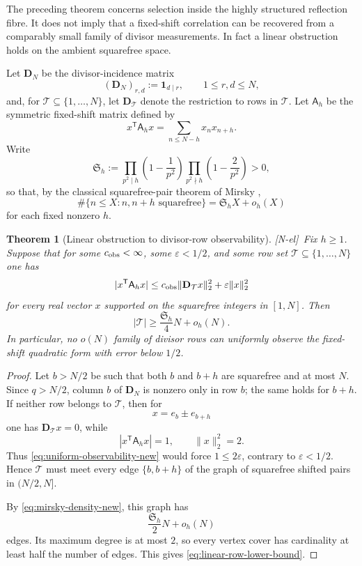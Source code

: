 \documentclass[11pt]{amsart}
\numberwithin{equation}{section}
\theoremstyle{plain}
\newtheorem{theorem}{Theorem}[section]
\theoremstyle{definition}
\theoremstyle{remark}
\newcommand{\tagNE}{\textup{[N-el]}}
\begin{document}
The preceding theorem concerns selection inside the highly structured reflection fibre.  It does not imply that a fixed-shift correlation can be recovered from a comparably small family of divisor measurements.  In fact a linear obstruction holds on the ambient squarefree space.

Let $\mathbf D_N$ be the divisor-incidence matrix
\[
(\mathbf D_N)_{r,d}:=\mathbf 1_{d\mid r},
\qquad 1\le r,d\le N,
\]
and, for $\mathcal T\subseteq\{1,\dots,N\}$, let $\mathbf D_\mathcal T$ denote the restriction to rows in $\mathcal T$.  Let $\mathsf A_h$ be the symmetric fixed-shift matrix defined by
\[
x^{\mathsf T}\mathsf A_hx
=
\sum_{n\le N-h}x_nx_{n+h}.
\]
Write
\begin{equation}
\mathfrak S_h
:=
\prod_{p^2\mid h}\left(1-\frac1{p^2}\right)
\prod_{p^2\nmid h}\left(1-\frac2{p^2}\right)>0,
\label{eq:mirsky-density-new}
\end{equation}
so that, by the classical squarefree-pair theorem of Mirsky \cite{Mirsky1949},
\[
\#\{n\le X:n,n+h\text{ squarefree}\}
=
\mathfrak S_hX+o_h(X)
\]
for each fixed nonzero $h$.

\begin{theorem}[Linear obstruction to divisor-row observability]
\label{thm:linear-observability-obstruction}
\tagNE\ Fix $h\ge1$.  Suppose that for some $c_{\rm obs}<\infty$, some $\varepsilon<1/2$, and some row set $\mathcal T\subseteq\{1,\dots,N\}$ one has
\begin{equation}
|x^{\mathsf T}\mathsf A_hx|
\le
c_{\rm obs}\|\mathbf D_\mathcal T x\|_2^2
+
\varepsilon\|x\|_2^2
\label{eq:uniform-observability-new}
\end{equation}
for every real vector $x$ supported on the squarefree integers in $[1,N]$.  Then
\begin{equation}
|\mathcal T|
\ge
\frac{\mathfrak S_h}{4}N+o_h(N).
\label{eq:linear-row-lower-bound}
\end{equation}
In particular, no $o(N)$ family of divisor rows can uniformly observe the fixed-shift quadratic form with error below $1/2$.
\end{theorem}

\begin{proof}
Let $b>N/2$ be such that both $b$ and $b+h$ are squarefree and at most $N$.  Since $q>N/2$, column $b$ of $\mathbf D_N$ is nonzero only in row $b$; the same holds for $b+h$.  If neither row belongs to $\mathcal T$, then for
\[
x=e_b\pm e_{b+h}
\]
one has $\mathbf D_\mathcal T x=0$, while
\[
|x^{\mathsf T}\mathsf A_hx|=1,
\qquad
\|x\|_2^2=2.
\]
Thus \eqref{eq:uniform-observability-new} would force $1\le2\varepsilon$, contrary to $\varepsilon<1/2$.  Hence $\mathcal T$ must meet every edge $\{b,b+h\}$ of the graph of squarefree shifted pairs in $(N/2,N]$.

By \eqref{eq:mirsky-density-new}, this graph has
\[
\frac{\mathfrak S_h}{2}N+o_h(N)
\]
edges.  Its maximum degree is at most $2$, so every vertex cover has cardinality at least half the number of edges.  This gives \eqref{eq:linear-row-lower-bound}.
\end{proof}
\end{document}
